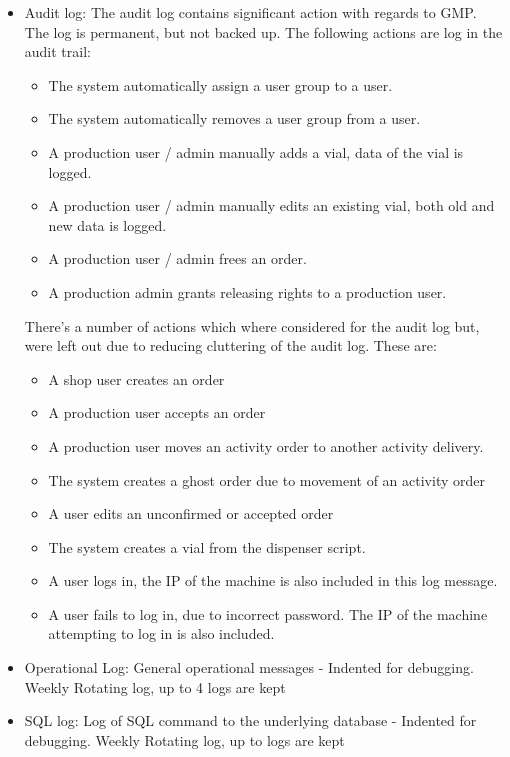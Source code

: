 \documentclass{article}
\begin{document}
\begin{itemize}
  \item Audit log: The audit log contains significant action with regards to GMP. The log is permanent, but not backed up.  The following actions are log in the audit trail:
  \begin{itemize}
    \item The system automatically assign a user group to a user.
    \item The system automatically removes a user group from a user.
    \item A production user / admin manually adds a vial, data of the vial is logged.
    \item A production user / admin manually edits an existing vial, both old and new data is logged.
    \item A production user / admin frees an order.
    \item A production admin grants releasing rights to a production user.
  \end{itemize}
  There's a number of actions which where considered for the audit log but, were left out due to reducing cluttering of the audit log. These are:
  \begin{itemize}
    \item A shop user creates an order
    \item A production user accepts an order
    \item A production user moves an activity order to another activity delivery.
    \item The system creates a ghost order due to movement of an activity order
    \item A user edits an unconfirmed or accepted order
    \item The system creates a vial from the dispenser script.
    \item A user logs in, the IP of the machine is also included in this log message.
    \item A user fails to log in, due to incorrect password. The IP of the machine attempting to log in is also included.
  \end{itemize}
  \item Operational Log: General operational messages - Indented for debugging. Weekly Rotating log, up to 4 logs are kept
  \item SQL log: Log of SQL command to the underlying database - Indented for debugging. Weekly Rotating log, up to logs are kept
\end{itemize}
\end{document}
